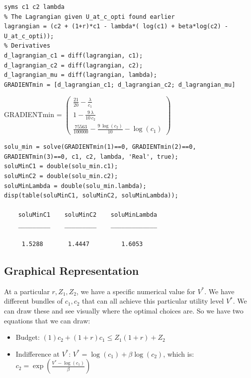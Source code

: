 \documentclass[
]{book}
\begin{document}
\begin{verbatim}
syms c1 c2 lambda
% The Lagrangian given U_at_c_opti found earlier
lagrangian = (c2 + (1+r)*c1 - lambda*( log(c1) + beta*log(c2) - U_at_c_opti));
% Derivatives
d_lagrangian_c1 = diff(lagrangian, c1);
d_lagrangian_c2 = diff(lagrangian, c2);
d_lagrangian_mu = diff(lagrangian, lambda);
GRADIENTmin = [d_lagrangian_c1; d_lagrangian_c2; d_lagrangian_mu]
\end{verbatim}

GRADIENTmin = \(\displaystyle \left(\begin{array}{c} \frac{21}{20}-\frac{\lambda }{c_1 }\\ 1-\frac{9\,\lambda }{10\,c_2 }\\ \frac{75563}{100000}-\frac{9\,\log \left(c_2 \right)}{10}-\log \left(c_1 \right) \end{array}\right)\)

\begin{verbatim}
solu_min = solve(GRADIENTmin(1)==0, GRADIENTmin(2)==0, GRADIENTmin(3)==0, c1, c2, lambda, 'Real', true);
soluMinC1 = double(solu_min.c1);
soluMinC2 = double(solu_min.c2);
soluMinLambda = double(solu_min.lambda);
disp(table(soluMinC1, soluMinC2, soluMinLambda));

    soluMinC1    soluMinC2    soluMinLambda
    _________    _________    _____________

     1.5288       1.4447         1.6053    
\end{verbatim}

\hypertarget{graphical-representation}{%
\subsection{Graphical Representation}\label{graphical-representation}}

At a particular \(r,Z_1 ,Z_2\), we have a specific numerical value for
\(V^*\). We have different bundles of \(c_1 ,c_2\) that can all achieve this
particular utility level \(V^*\). We can draw these and see visually where
the optimal choices are. So we have two equations that we can draw:

\begin{itemize}
\item
  Budget: \((1)c_2 +(1+r)c_1 \le Z_1 (1+r)+Z_2\)
\item
  Indifference at \(V^*\): \(V^* =\log (c_1 )+\beta \log (c_2 )\), which
  is: \(c_2 =\exp \left(\frac{V^* -\log (c_1 )}{\beta }\right)\)
\end{itemize}
\end{document}
